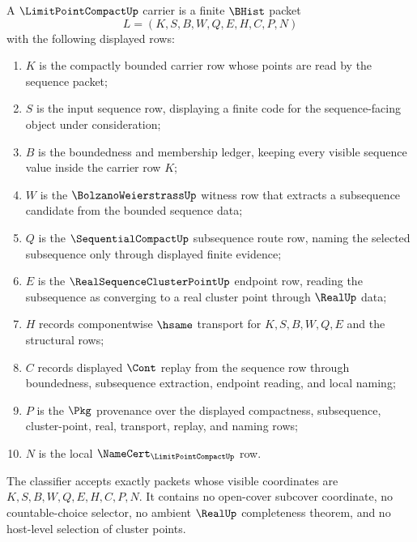 \begin{definition}\label{def:limit-point-compact-carrier}
A $\LimitPointCompactUp$ carrier is a finite $\BHist$ packet
$$
L=(K,S,B,W,Q,E,H,C,P,N)
$$
with the following displayed rows:
\begin{enumerate}
\item $K$ is the compactly bounded carrier row whose points are read by the sequence packet;
\item $S$ is the input sequence row, displaying a finite code for the sequence-facing object under consideration;
\item $B$ is the boundedness and membership ledger, keeping every visible sequence value inside the carrier row $K$;
\item $W$ is the $\BolzanoWeierstrassUp$ witness row that extracts a subsequence candidate from the bounded sequence data;
\item $Q$ is the $\SequentialCompactUp$ subsequence route row, naming the selected subsequence only through displayed finite evidence;
\item $E$ is the $\RealSequenceClusterPointUp$ endpoint row, reading the subsequence as converging to a real cluster point through $\RealUp$ data;
\item $H$ records componentwise $\hsame$ transport for $K,S,B,W,Q,E$ and the structural rows;
\item $C$ records displayed $\Cont$ replay from the sequence row through boundedness, subsequence extraction, endpoint reading, and local naming;
\item $P$ is the $\Pkg$ provenance over the displayed compactness, subsequence, cluster-point, real, transport, replay, and naming rows;
\item $N$ is the local $\NameCert_{\LimitPointCompactUp}$ row.
\end{enumerate}
The classifier accepts exactly packets whose visible coordinates are $K,S,B,W,Q,E,H,C,P,N$. It contains no open-cover subcover coordinate, no countable-choice selector, no ambient $\RealUp$ completeness theorem, and no host-level selection of cluster points.
\end{definition}

